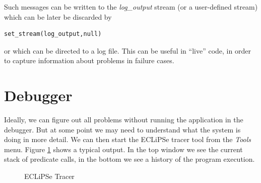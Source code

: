 \documentclass[a4paper,12pt]{report}
\begin{document}
Such messages can be written to the {\it log\_output} stream (or a user-defined stream) which can be later be discarded by
\begin{verbatim}
set_stream(log_output,null)
\end{verbatim}
or which can be directed to a log file. This can be useful in ``live'' code, in order to capture information about problems in failure cases.
\section{Debugger}
Ideally, we can figure out all problems without running the application in the debugger. But at some point we may need to understand what the system is doing in more detail. We can then start the ECLiPSe tracer tool from the {\it Tools} menu. Figure \ref{Tracer} shows a typical output. In the top window we see the current stack of predicate calls, in the bottom we see a history of the program execution. 
\begin{figure}[thbp]
\begin{center}
\end{center}
\caption{\label{Tracer}ECLiPSe Tracer}
\end{figure}
\end{document}
